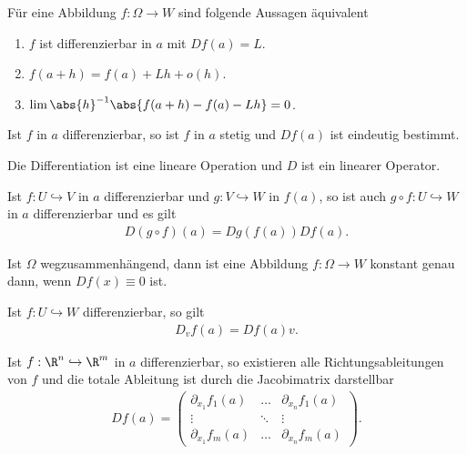 \begin{prop}
Für eine Abbildung $f:\Omega \to W$ sind folgende Aussagen äquivalent
\begin{enumerate}
  \item $f$ ist differenzierbar in $a$ mit $Df(a) = L$.
  \item $f(a+h) = f(a) + Lh + o(h)$. 
  \item $\lim \abs{h}^{-1}\abs{f(a+h)-f(a)-Lh} = 0$.
\end{enumerate}
\end{prop}
\begin{prop}
Ist $f$ in $a$ differenzierbar, so ist $f$ in $a$ stetig und $Df(a)$ ist
eindeutig bestimmt.
\end{prop}
\begin{prop}
Die Differentiation ist eine lineare Operation und $D$ ist ein linearer
Operator.
\end{prop}
\begin{prop}[Kettenregel]
Ist $f: U\hookrightarrow V$ in $a$ differenzierbar und $g:
V\hookrightarrow W$ in $f(a)$, so ist auch $g\circ f: U\hookrightarrow W$ in
$a$ differenzierbar und es gilt
\begin{align*}
D(g\circ f)(a) = Dg(f(a))Df(a).
\end{align*}
\end{prop}
\begin{prop}
Ist $\Omega$ wegzusammenhängend, dann ist eine Abbildung $f: \Omega\to W$
konstant genau dann, wenn $Df(x) \equiv 0$ ist.
\end{prop}
\begin{prop}
Ist $f: U\hookrightarrow W$ differenzierbar, so gilt
\begin{align*}
D_vf(a) = Df(a)v.
\end{align*}
\end{prop}
\begin{prop}
Ist $f: \R^n\hookrightarrow\R^m$ in $a$ differenzierbar, so existieren alle
Richtungsableitungen von $f$ und die totale Ableitung ist durch die Jacobimatrix darstellbar
\begin{align*}
Df(a) = \begin{pmatrix}
        \partial_{x_1}f_1(a) & \ldots & \partial_{x_n}f_1(a)\\
        \vdots & \ddots & \vdots\\
        \partial_{x_1}f_m(a) & \ldots & \partial_{x_n}f_m(a)
        \end{pmatrix}.
\end{align*}
\end{prop}
